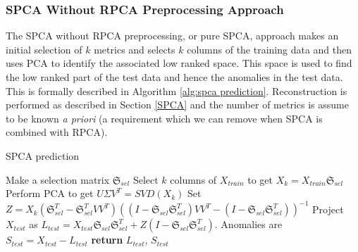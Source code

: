\documentclass[conference]{IEEEtran}
\begin{document}
\subsubsection{SPCA Without RPCA Preprocessing Approach}
The SPCA without RPCA preprocessing, or pure SPCA, approach makes an initial selection of $k$ metrics and selects $k$ columns of the training data and then uses PCA to identify the associated low ranked space.  This space is used to find the low ranked part of the test data and hence the anomalies in the test data. This is formally described in Algorithm \ref{alg:spca prediction}.  Reconstruction is performed as described in Section \ref{SPCA} and the number of metrics is assume to be known \emph{a priori} (a requirement which we can remove when SPCA is combined with RPCA). 
\begin{algorithm}
\caption{SPCA prediction}\label{alg:spca prediction}
\begin{algorithmic}[1]
\State Make a selection matrix $\mathfrak{S}_{sel}$
\State Select $k$ columns of $X_{train}$ to get $X_k = X_{train} \mathfrak{S}_{sel}$
\State Perform PCA to get $U \Sigma V^T = SVD(X_k)$
\State Set $Z = X_k (\mathfrak{S}_{sel}^T - \mathfrak{S}_{sel}^T V V^T)  ((I-\mathfrak{S}_{sel} \mathfrak{S}_{sel}^T)V V^T - (I-\mathfrak{S}_{sel} \mathfrak{S}_{sel}^T))^{-1}$
\State Project $X_{test}$ as $L_{test} = X_{test} \mathfrak{S}_{sel} \mathfrak{S}_{sel}^T + Z (I-\mathfrak{S}_{sel} \mathfrak{S}_{sel}^T)$.
\State Anomalies are $S_{test} = X_{test} - L_{test}$
\State \textbf{return} $L_{test}$, $S_{test}$
\EndProcedure
\end{algorithmic}
\end{algorithm}

\end{document}

